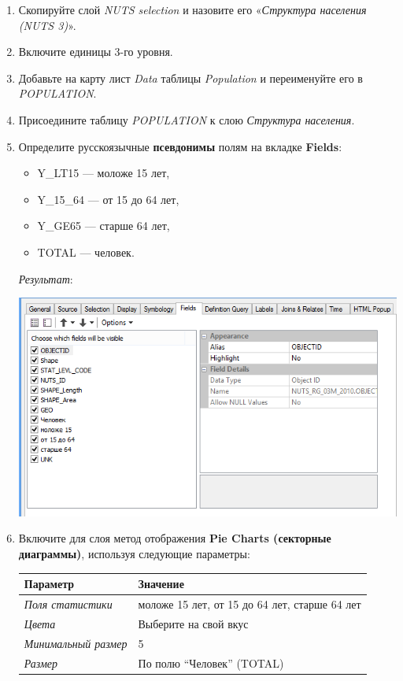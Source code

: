 \documentclass[12pt,]{book}
\providecommand{\tightlist}{%
  \setlength{\itemsep}{0pt}\setlength{\parskip}{0pt}}
\begin{document}
\begin{enumerate}
\def\labelenumi{\arabic{enumi}.}
\item
  Скопируйте слой \emph{NUTS selection} и назовите его «\emph{Структура населения (NUTS 3)}».
\item
  Включите единицы 3-го уровня.
\item
  Добавьте на карту лист \emph{Data} таблицы \emph{Population} и переименуйте его в \emph{POPULATION}.
\item
  Присоедините таблицу \emph{POPULATION} к слою \emph{Структура населения}.
\item
  Определите русскоязычные \textbf{псевдонимы} полям на вкладке \textbf{Fields}:

  \begin{itemize}
  \tightlist
  \item
    Y\_LT15 --- моложе 15 лет,
  \item
    Y\_15\_64 --- от 15 до 64 лет,
  \item
    Y\_GE65 --- старше 64 лет,
  \item
    TOTAL --- человек.
  \end{itemize}

  \emph{Результат}:

  \includegraphics{images/Ex08/image28.png}
\item
  Включите для слоя метод отображения \textbf{Pie Charts (секторные диаграммы)}, используя следующие параметры:

  \begin{longtable}[]{@{}ll@{}}
  \toprule
  Параметр & Значение\tabularnewline
  \midrule
  \endhead
  \emph{Поля статистики} & моложе 15 лет, от 15 до 64 лет, старше 64 лет\tabularnewline
  \emph{Цвета} & Выберите на свой вкус\tabularnewline
  \emph{Минимальный размер} & 5\tabularnewline
  \emph{Размер} & По полю ``Человек'' (TOTAL)\tabularnewline
  \bottomrule
  \end{longtable}


\end{enumerate}
\end{document}
